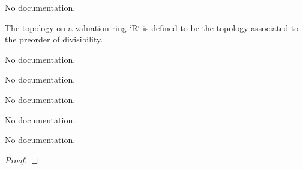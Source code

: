 \begin{definition}
\begin{theorem}\label{ord_top}
                No documentation.
    \end{theorem}

\begin{definition}\label{ValuationTopology.ValuationRing.setoid}
                The topology on a valuation ring `R` is defined to be the topology associated to the preorder of divisibility.
    \end{definition}

\begin{definition}\label{ValuationTopology.ValuationRing.ValueMonoid}
                No documentation.
    \end{definition}

\begin{definition}\label{CompleteDiscreteValuationRing}
        \leanok
                No documentation.
    \end{definition}

\begin{definition}\label{CompleteValuationField}
        \leanok
                No documentation.
    \end{definition}

\begin{definition}\label{CompleteDiscreteValuationField}
        \leanok
                No documentation.
    \end{definition}

\begin{theorem}\label{sub_of_sum}
        \leanok
                No documentation.
    \end{theorem}

\begin{proof}
    \leanok
\end{proof}


\end{definition}
